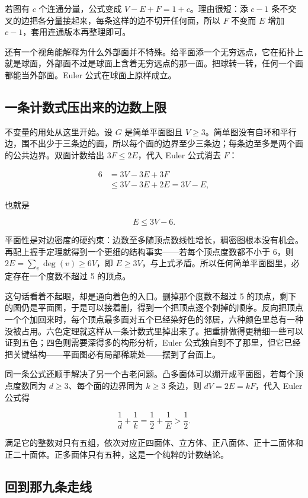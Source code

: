 若图有 \(c\) 个连通分量，公式变成 \(V-E+F=1+c\)。理由很短：添 \(c-1\) 条不交叉的边把各分量接起来，每条这样的边不切开任何面，所以 \(F\) 不变而 \(E\) 增加 \(c-1\)，套用连通版本再整理即可。

还有一个视角能解释为什么外部面并不特殊。给平面添一个无穷远点，它在拓扑上就是球面，外部面不过是球面上含着无穷远点的那一面。把球转一转，任何一个面都能当外部面。Euler 公式在球面上原样成立。

\subsection{一条计数式压出来的边数上限}

不变量的用处从这里开始。设 \(G\) 是简单平面图且 \(V\ge 3\)。简单图没有自环和平行边，围不出少于三条边的面，所以每个面的边界至少三条边；每条边至多是两个面的公共边界。双面计数给出 \(3F\le 2E\)，代入 Euler 公式消去 \(F\)：

\[
\begin{aligned}
6&=3V-3E+3F\\
&\le 3V-3E+2E=3V-E,
\end{aligned}
\]

也就是

\[
E\le 3V-6.
\]

平面性是对边密度的硬约束：边数至多随顶点数线性增长，稠密图根本没有机会。再配上握手定理就得到一个更细的结构事实——若每个顶点度数都不小于 6，则 \(2E=\sum_{v}\deg(v)\ge 6V\)，即 \(E\ge 3V\)，与上式矛盾。所以任何简单平面图里，必定存在一个度数不超过 5 的顶点。

这句话看着不起眼，却是通向着色的入口。删掉那个度数不超过 5 的顶点，剩下的图仍是平面图，于是可以接着删，得到一个把顶点逐个剥掉的顺序。反向把顶点一个个加回来时，每个顶点最多面对五个已经染好色的邻居，六种颜色里总有一种没被占用。六色定理就这样从一条计数式里掉出来了。把重排做得更精细一些可以证到五色；四色则需要深得多的构形分析，Euler 公式独自到不了那里，但它已经把关键结构——平面图必有局部稀疏处——摆到了台面上。

同一条公式还顺手解决了另一个古老问题。凸多面体可以绷开成平面图，若每个顶点度数同为 \(d\ge 3\)、每个面的边界同为 \(k\ge 3\) 条边，则 \(dV=2E=kF\)，代入 Euler 公式得

\[
\frac{1}{d}+\frac{1}{k}=\frac{1}{2}+\frac{1}{E}>\frac{1}{2}.
\]

满足它的整数对只有五组，依次对应正四面体、立方体、正八面体、正十二面体和正二十面体。正多面体只有五种，这是一个纯粹的计数结论。

\subsection{回到那九条走线}

